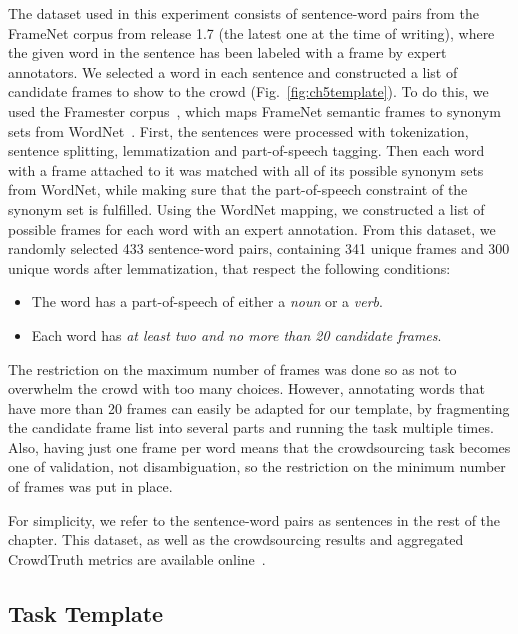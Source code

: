 The dataset used in this experiment consists of sentence-word pairs from the FrameNet corpus from release 1.7 (the latest one at the time of writing), where  the given word in the sentence has been labeled with a frame by expert annotators. We selected a word in each sentence and constructed a list of candidate frames to show to the crowd (Fig.~\ref{fig:ch5template}). To do this, we used the Framester corpus~\cite{gangemi2016framester}, which maps FrameNet semantic frames to synonym sets from WordNet~\cite{miller1995wordnet}. First, the sentences were processed with tokenization, sentence splitting, lemmatization and part-of-speech tagging. Then each word with a frame attached to it was matched with all of its possible synonym sets from WordNet, while making sure that the part-of-speech constraint of the synonym set is fulfilled. Using the WordNet mapping, we constructed a list of possible frames for each word with an expert annotation. From this dataset, we randomly selected 433 sentence-word pairs, containing 341 unique frames and 300 unique words after lemmatization, that respect the following conditions:

\begin{itemize}

\item The word has a part-of-speech of either a \textit{noun} or a \textit{verb}.

\item Each word has \textit{at least two and no more than 20 candidate frames}.

\end{itemize}

The restriction on the maximum number of frames was done so as not to overwhelm the crowd with too many choices. However, annotating words that have more than 20 frames can easily be adapted for our template, by fragmenting the candidate frame list into several parts and running the task multiple times. Also, having just one frame per word means that the crowdsourcing task becomes one of validation, not disambiguation, so the restriction on the minimum number of frames was put in place.

For simplicity, we refer to the sentence-word pairs as sentences in the rest of the chapter. This dataset, as well as the crowdsourcing results and aggregated CrowdTruth metrics are available online~\cite{anca_dumitrache_2018_1472345}.

\subsection{Task Template}


